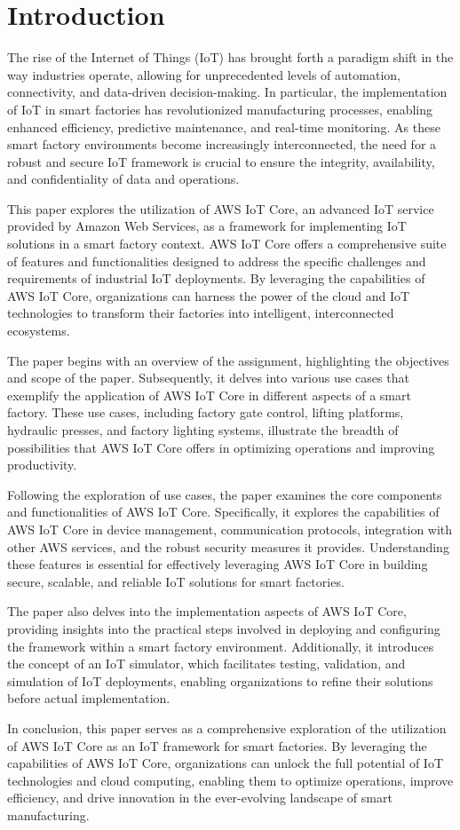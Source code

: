 \chapter{Introduction}

The rise of the Internet of Things (IoT) has brought forth a paradigm shift in the way industries operate, allowing for unprecedented levels of automation, connectivity, and data-driven decision-making. 
In particular, the implementation of IoT in smart factories has revolutionized manufacturing processes, enabling enhanced efficiency, predictive maintenance, and real-time monitoring. 
As these smart factory environments become increasingly interconnected, the need for a robust and secure IoT framework is crucial to ensure the integrity, availability, and confidentiality of data and operations.

This paper explores the utilization of AWS IoT Core, an advanced IoT service provided by Amazon Web Services, as a framework for implementing IoT solutions in a smart factory context. 
AWS IoT Core offers a comprehensive suite of features and functionalities designed to address the specific challenges and requirements of industrial IoT deployments. By leveraging the capabilities of AWS IoT Core, organizations can harness the power of the cloud and IoT technologies to transform their factories into intelligent, interconnected ecosystems.

The paper begins with an overview of the assignment, highlighting the objectives and scope of the paper. 
Subsequently, it delves into various use cases that exemplify the application of AWS IoT Core in different aspects of a smart factory. 
These use cases, including factory gate control, lifting platforms, hydraulic presses, and factory lighting systems, illustrate the breadth of possibilities that AWS IoT Core offers in optimizing operations and improving productivity.

Following the exploration of use cases, the paper examines the core components and functionalities of AWS IoT Core. Specifically, it explores the capabilities of AWS IoT Core in device management, communication protocols, integration with other AWS services, and the robust security measures it provides. 
Understanding these features is essential for effectively leveraging AWS IoT Core in building secure, scalable, and reliable IoT solutions for smart factories.

The paper also delves into the implementation aspects of AWS IoT Core, providing insights into the practical steps involved in deploying and configuring the framework within a smart factory environment. 
Additionally, it introduces the concept of an IoT simulator, which facilitates testing, validation, and simulation of IoT deployments, enabling organizations to refine their solutions before actual implementation.

In conclusion, this paper serves as a comprehensive exploration of the utilization of AWS IoT Core as an IoT framework for smart factories. 
By leveraging the capabilities of AWS IoT Core, organizations can unlock the full potential of IoT technologies and cloud computing, enabling them to optimize operations, improve efficiency, and drive innovation in the ever-evolving landscape of smart manufacturing.